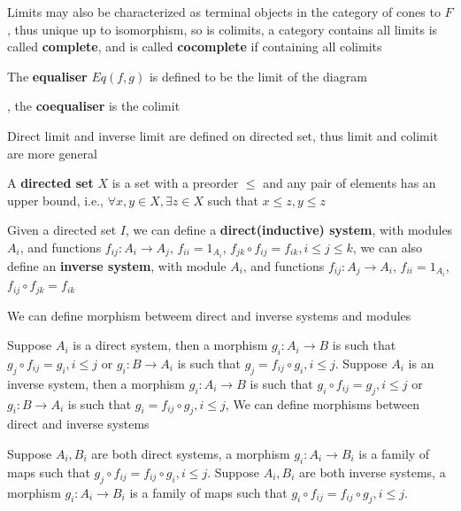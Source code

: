\documentclass[main]{subfiles}
\begin{document}
\begin{definition}
\begin{center}
\end{center}
Limits may also be characterized as terminal objects in the category of cones to $F$, thus unique up to isomorphism, so is colimits, a category contains all limits is called \textbf{complete}, and is called \textbf{cocomplete} if containing all colimits \par
The \textbf{equaliser} $Eq(f,g)$ is defined to be the limit of the diagram , the \textbf{coequaliser} is the colimit
\end{definition}

\begin{remark}
Direct limit and inverse limit are defined on directed set, thus limit and colimit are more general
\end{remark}

\begin{definition}
A \textbf{directed set} $X$ is a set with a preorder $\leq$ and any pair of elements has an upper bound, i.e., $\forall x,y\in X,\exists z\in X$ such that $x\leq z,y\leq z$
\end{definition}

\begin{definition}
Given a directed set $I$, we can define a \textbf{direct(inductive) system}, with modules $A_i$, and functions $f_{ij}:A_i\to A_j$, $f_{ii}=1_{A_i}$, $f_{jk}\circ f_{ij}=f_{ik},i\leq j\leq k$, we can also define an \textbf{inverse system}, with module $A_i$, and functions $f_{ij}:A_j\to A_i$, $f_{ii}=1_{A_i}$, $f_{ij}\circ f_{jk}=f_{ik}$ \par
We can define morphism betweem direct and inverse systems and modules \par
Suppose $A_i$ is a direct system, then a morphism $g_i:A_i\to B$ is such that $g_j\circ f_{ij}=g_i,i\leq j$ or $g_i:B\to A_i$ is such that $g_j=f_{ij}\circ g_i,i\leq j$. Suppose $A_i$ is an inverse system, then a morphism $g_i:A_i\to B$ is such that $g_i\circ f_{ij}=g_j,i\leq j$ or $g_i:B\to A_i$ is such that $g_i=f_{ij}\circ g_j,i\leq j$, 
We can define morphisms between direct and inverse systems \par
Suppose $A_i,B_i$ are both direct systems, a morphism $g_i:A_i\to B_i$ is a family of maps such that $g_j\circ f_{ij}=f_{ij}\circ g_i,i\leq j$. Suppose $A_i,B_i$ are both inverse systems, a morphism $g_i:A_i\to B_i$ is a family of maps such that $g_i\circ f_{ij}=f_{ij}\circ g_j,i\leq j$. 
\end{definition}
\end{document}
